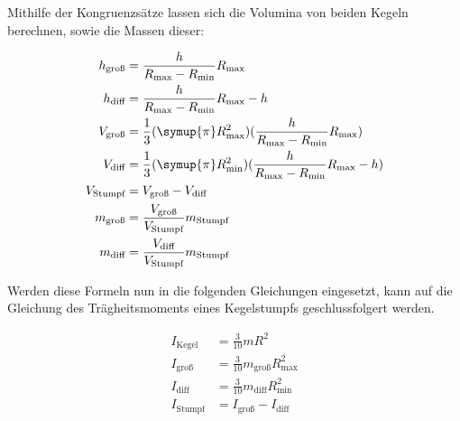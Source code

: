 Mithilfe der Kongruenzsätze lassen sich die Volumina von beiden Kegeln berechnen, sowie die Massen dieser:

\begin{align}
    h_\text{groß}&= \frac{h}{R_\text{max}-R_\text{min}} R_\text{max} \\
    h_\text{diff}&= \frac{h}{R_\text{max}-R_\text{min}} R_\text{max}-h \\
    V_\text{groß}&= \frac{1}{3} (\symup{\pi} R_\text{max}^2) (\frac{h}{R_\text{max}-R_\text{min}} R_\text{max}) \\
    V_\text{diff}&= \frac{1}{3} (\symup{\pi} R_\text{min}^2) (\frac{h}{R_\text{max}-R_\text{min}} R_\text{max}-h) \\
    V_\text{Stumpf}&= V_\text{groß}-V_\text{diff} \\
    m_\text{groß}&= \frac{V_\text{groß}}{V_\text{Stumpf}}m_\text{Stumpf} \\
    m_\text{diff}&= \frac{V_\text{diff}}{V_\text{Stumpf}}m_\text{Stumpf}
\end{align}

Werden diese Formeln nun in die folgenden Gleichungen eingesetzt, kann auf die Gleichung des Trägheitsmoments eines 
Kegelstumpfs geschlussfolgert werden. 

\begin{align}
    I_\text{Kegel}&=\frac{3}{10}mR^2 \\
    I_\text{groß}&=\frac{3}{10}m_\text{groß}R_\text{max}^2 \\
    I_\text{diff}&=\frac{3}{10}m_\text{diff}R_\text{min}^2 \\
    I_\text{Stumpf}&=I_\text{groß}-I_\text{diff}
\end{align}
